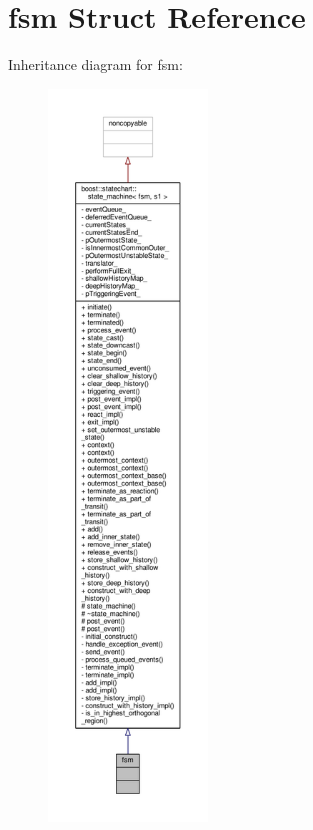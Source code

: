 \hypertarget{structfsm}{}\section{fsm Struct Reference}
\label{structfsm}


Inheritance diagram for fsm\+:
\nopagebreak
\begin{figure}[H]
\begin{center}
\leavevmode
\includegraphics[height=550pt]{structfsm__inherit__graph}
\end{center}
\end{figure}


